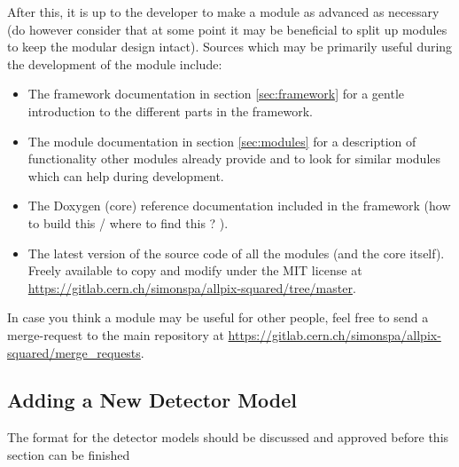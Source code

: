 After this, it is up to the developer to make a module as advanced as necessary (do however consider that at some point it may be beneficial to split up modules to keep the modular design intact). Sources which may be primarily useful during the development of the module include:
\begin{itemize}
\item The framework documentation in section \ref{sec:framework} for a gentle introduction to the different parts in the framework.
\item The module documentation in section \ref{sec:modules} for a description of functionality other modules already provide and to look for similar modules which can help during development.
\item The Doxygen (core) reference documentation included in the framework (\todo how to build this / where to find this ? \todo).
\item The latest version of the source code of all the modules (and the core itself). Freely available to copy and modify under the MIT license at \url{https://gitlab.cern.ch/simonspa/allpix-squared/tree/master}.
\end{itemize}

In case you think a module may be useful for other people, feel free to send a merge-request to the main repository at \url{https://gitlab.cern.ch/simonspa/allpix-squared/merge_requests}.

\subsection{Adding a New Detector Model}
\label{sec:adding_detector_model}
\todo The format for the detector models should be discussed and approved before this section can be finished \todo
